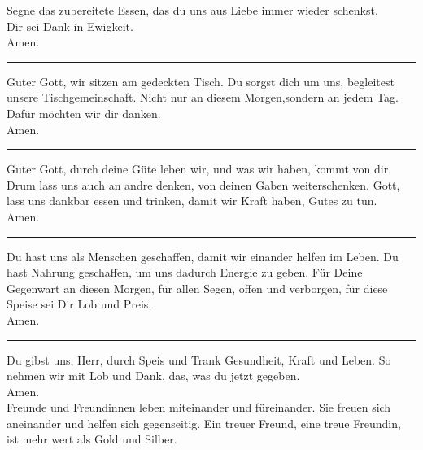 Segne das zubereitete Essen, das du uns aus Liebe immer wieder schenkst.\\
Dir sei Dank in Ewigkeit.\\ \newline
Amen.\\
\par\noindent\rule{\textwidth}{0.4pt} \newline \newline
Guter Gott, wir sitzen am gedeckten Tisch. Du sorgst dich um uns, begleitest unsere Tischgemeinschaft. Nicht nur an diesem Morgen,sondern an jedem Tag. Dafür möchten wir dir danken.\\ \newline
Amen.\\
\par\noindent\rule{\textwidth}{0.4pt} \newline \newline
Guter Gott, durch deine Güte leben wir, und was wir haben, kommt von dir. Drum lass uns auch an andre denken, von deinen Gaben weiterschenken. Gott, lass uns dankbar essen und trinken, damit wir Kraft haben, Gutes zu tun.\\ \newline
Amen.\\
\par\noindent\rule{\textwidth}{0.4pt} \newline \newline
Du hast uns als Menschen geschaffen, damit wir einander helfen im Leben.  Du hast Nahrung geschaffen, um uns dadurch Energie zu geben.   Für Deine Gegenwart an diesen Morgen, für allen Segen, offen und verborgen, für diese Speise sei Dir Lob und Preis.\\ \newline
Amen.\\
\par\noindent\rule{\textwidth}{0.4pt} \newline \newline
Du gibst uns, Herr, durch Speis und Trank Gesundheit, Kraft und Leben.  So nehmen wir mit Lob und Dank, das, was du jetzt gegeben. \\ \newline
Amen.\\
Freunde und Freundinnen leben miteinander und füreinander.  Sie  freuen  sich  aneinander  und  helfen  sich  gegenseitig.  Ein  treuer  Freund,  eine  treue Freundin, ist mehr wert als Gold und Silber.\\ \newline
